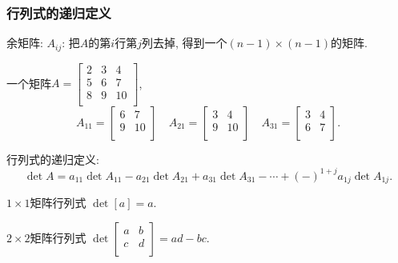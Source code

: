 \subsubsection{行列式的递归定义}
\begin{definition}
  余矩阵: $A_{ij}$: 把$A$的第$i$行第$j$列去掉, 得到一个$ \left( n-1 \right) \times  \left( n-1 \right) $的矩阵.
\end{definition}
\begin{example}
  一个矩阵$A = \begin{bmatrix}
   2 & 3 & 4\\
   5 & 6 & 7\\
   8 & 9 & 10\\
  \end{bmatrix}$,
  \begin{equation}
    A_{11} = \begin{bmatrix}
     6 & 7\\
     9 & 10\\
    \end{bmatrix}
    \quad
    A_{21} = \begin{bmatrix}
     3 & 4\\
     9 & 10\\
    \end{bmatrix}
    \quad
    A_{31} = \begin{bmatrix}
     3 & 4\\
     6 & 7\\
    \end{bmatrix}.
  \end{equation}
\end{example}

行列式的递归定义:
\begin{equation}
\det A = a_{11} \det A_{11} - a_{21} \det A_{21} + a_{31} \det A_{31} - \cdots + \left( - \right) ^{1+j} a_{1j} \det A_{1j}. 
\end{equation}

\begin{example}
  $1 \times 1$矩阵行列式 $\det [a] = a$.

  $2 \times 2$矩阵行列式 $\det \begin{bmatrix}
   a & b\\
   c & d\\
  \end{bmatrix} = ad - bc.$
\end{example}